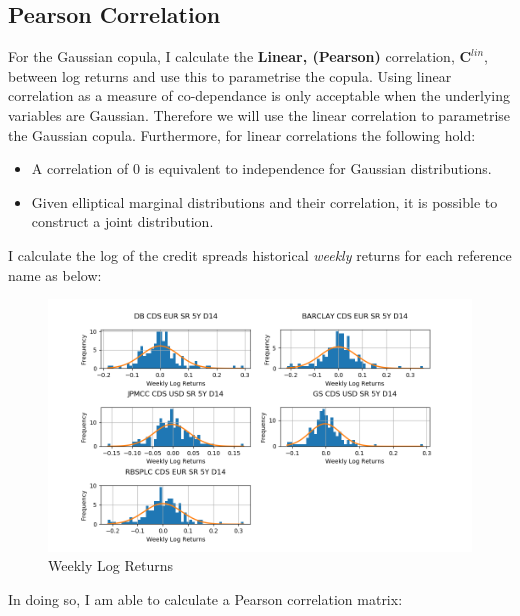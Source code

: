 \documentclass{report}
\theoremstyle{plain}
\theoremstyle{definition}
\begin{document}
\subsection{Pearson Correlation}

For the Gaussian copula, I calculate the \textbf{Linear, (Pearson)} correlation, $\mathbf{C}^{lin}$, between log returns and use this to parametrise the copula. Using linear correlation as a measure of co-dependance is only acceptable when the underlying variables are Gaussian. Therefore we will use the linear correlation to parametrise the Gaussian copula. Furthermore, for linear correlations the following hold:

\begin{itemize}
	\item A correlation of 0 is equivalent to independence for Gaussian distributions.
	\item Given elliptical marginal distributions and their correlation, it is possible to construct a joint distribution.
\end{itemize}

I calculate the log of the credit spreads historical \emph{weekly} returns for each reference name as below:

\begin{figure}[H]
	\begin{center}
		\includegraphics[width=15cm]{Weekly_log_returns.png}
		\caption{Weekly Log Returns} 
		\label{Weekly_log_returns}
	\end{center}
\end{figure}

In doing so, I am able to calculate a Pearson correlation matrix: 
\end{document}
